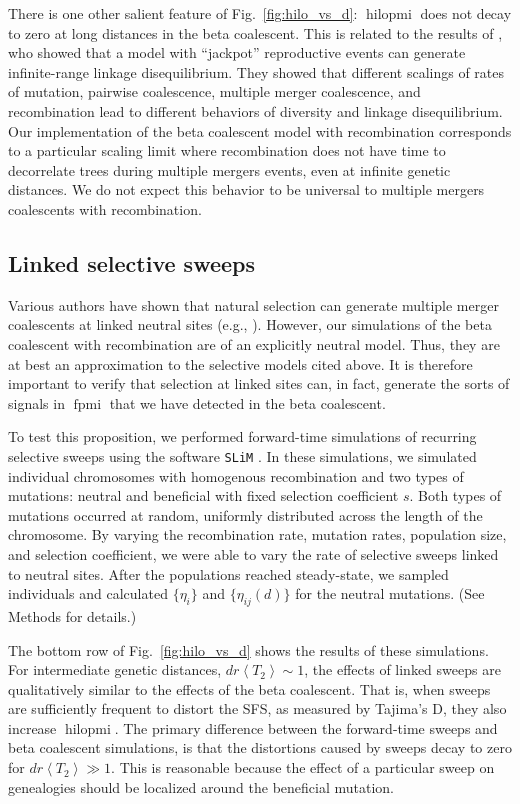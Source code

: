 \documentclass[11pt, letterpaper]{article}   	%
\newcommand{\fig}[1]{Fig.~\ref{#1}}
\newcommand{\E}[1]{\left< #1 \right>}
\DeclareMathOperator{\fpmi}{fpmi}
\DeclareMathOperator{\hilopmi}{hilopmi}
\begin{document}
There is one other salient feature of \fig{fig:hilo_vs_d}: $\hilopmi$ does not decay to zero at long distances in the beta coalescent.
This is related to the results of \cite{EldonWakeley20??}, who showed that a model with ``jackpot'' reproductive events can generate infinite-range linkage disequilibrium.
They showed that different scalings of rates of mutation, pairwise coalescence, multiple merger coalescence, and recombination lead to different behaviors of diversity and linkage disequilibrium.
Our implementation of the beta coalescent model with recombination corresponds to a particular scaling limit where recombination does not have time to decorrelate trees during multiple mergers events, even at infinite genetic distances.
We do not expect this behavior to be universal to multiple mergers coalescents with recombination.

\subsection*{Linked selective sweeps}

Various authors have shown that natural selection can generate multiple merger coalescents at linked neutral sites (e.g., \cite{DurrettSchweinsberg2005, CoopRalph, NeherHallatscheck2013, DesaiEtAl, Seger}).
However, our simulations of the beta coalescent with recombination are of an explicitly neutral model.
Thus, they are at best an approximation to the selective models cited above.
It is therefore important to verify that selection at linked sites can, in fact, generate the sorts of signals in $\fpmi$ that we have detected in the beta coalescent.

To test this proposition, we performed forward-time simulations of recurring selective sweeps using the software \texttt{SLiM} \autocite{MesserEtAl201?}.
In these simulations, we simulated individual chromosomes with homogenous recombination and two types of mutations: neutral and beneficial with fixed selection coefficient $s$.
Both types of mutations occurred at random, uniformly distributed across the length of the chromosome.
By varying the recombination rate, mutation rates, population size, and selection coefficient, we were able to vary the rate of selective sweeps linked to neutral sites.
After the populations reached steady-state, we sampled individuals and calculated $\{\eta_i\}$ and $\{\eta_{ij}(d)\}$ for the neutral mutations.
(See Methods for details.)

The bottom row of \fig{fig:hilo_vs_d} shows the results of these simulations.
For intermediate genetic distances, $d r \E{T_2} \sim 1$, the effects of linked sweeps are qualitatively similar to the effects of the beta coalescent.
That is, when sweeps are sufficiently frequent to distort the SFS, as measured by Tajima's D, they also increase $\hilopmi$.
The primary difference between the forward-time sweeps and beta coalescent simulations, is that the distortions caused by sweeps decay to zero for $d r \E{T_2} \gg 1$.
This is reasonable because the effect of a particular sweep on genealogies should be localized around the beneficial mutation.
\end{document}
